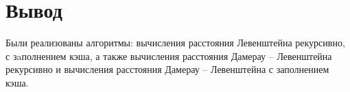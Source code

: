         
        
        
        
        \clearpage
        
        
        
        \clearpage
        
        
        
        \clearpage
        
        
        
        
        
    \section*{Вывод}
    
        Были реализованы алгоритмы: вычисления расстояния Левенштейна рекурсивно, с зaполнением кэша, а также вычисления расстояния Дамерау – Левенштейна рекурсивно и вычисления расстояния Дамерау – Левенштейна с заполнением кэша.